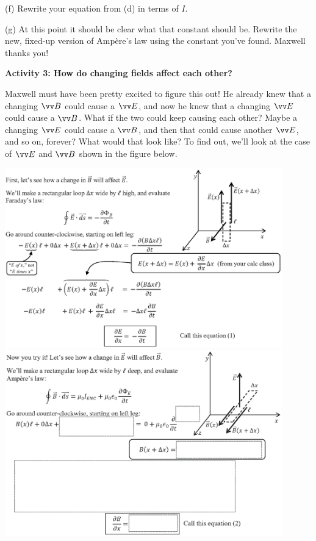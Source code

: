 (f) Rewrite your equation from (d) in terms of $I$.
\vspace{0.5in}

(g) At this point it should be clear what that constant should be.  Rewrite the new, fixed-up version of Amp\`ere's law using the constant you've found.  Maxwell thanks you!  
\vfill
\newpage

\textbf{Activity 3: How do changing fields affect each other?} 

Maxwell must have been pretty excited to figure this out!  He already knew that a changing $\vv B$ could cause a $\vv E$, and now he knew that a changing $\vv E$ could cause a $\vv B$.  What if the two could keep causing each other?  Maybe a changing $\vv E$ could cause a $\vv B$, and then that could cause another $\vv E$, and so on, forever?  What would that look like? To find out, we'll look at the case of $\vv E$ and $\vv B$ shown in the figure below.


\vspace{-0.1in}
\includegraphics[width=0.9\textwidth]{deriving_em_waves/change_in_B.eps} \newline
\underline{\hspace{\textwidth}}
\includegraphics[width=0.9\textwidth]{deriving_em_waves/change_in_E_bw.eps}
\newpage

